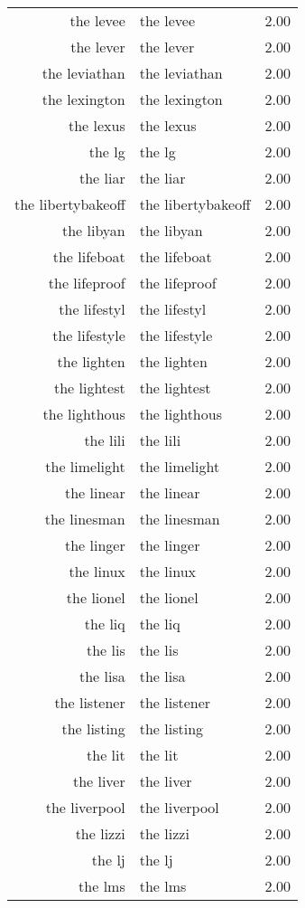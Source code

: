 \begin{table}[ht]
\begin{tabular}{rlr}
  the levee & the levee & 2.00 \\ 
  the lever & the lever & 2.00 \\ 
  the leviathan & the leviathan & 2.00 \\ 
  the lexington & the lexington & 2.00 \\ 
  the lexus & the lexus & 2.00 \\ 
  the lg & the lg & 2.00 \\ 
  the liar & the liar & 2.00 \\ 
  the libertybakeoff & the libertybakeoff & 2.00 \\ 
  the libyan & the libyan & 2.00 \\ 
  the lifeboat & the lifeboat & 2.00 \\ 
  the lifeproof & the lifeproof & 2.00 \\ 
  the lifestyl & the lifestyl & 2.00 \\ 
  the lifestyle & the lifestyle & 2.00 \\ 
  the lighten & the lighten & 2.00 \\ 
  the lightest & the lightest & 2.00 \\ 
  the lighthous & the lighthous & 2.00 \\ 
  the lili & the lili & 2.00 \\ 
  the limelight & the limelight & 2.00 \\ 
  the linear & the linear & 2.00 \\ 
  the linesman & the linesman & 2.00 \\ 
  the linger & the linger & 2.00 \\ 
  the linux & the linux & 2.00 \\ 
  the lionel & the lionel & 2.00 \\ 
  the liq & the liq & 2.00 \\ 
  the lis & the lis & 2.00 \\ 
  the lisa & the lisa & 2.00 \\ 
  the listener & the listener & 2.00 \\ 
  the listing & the listing & 2.00 \\ 
  the lit & the lit & 2.00 \\ 
  the liver & the liver & 2.00 \\ 
  the liverpool & the liverpool & 2.00 \\ 
  the lizzi & the lizzi & 2.00 \\ 
  the lj & the lj & 2.00 \\ 
  the lms & the lms & 2.00 \\ 

\end{tabular}
\end{table}
